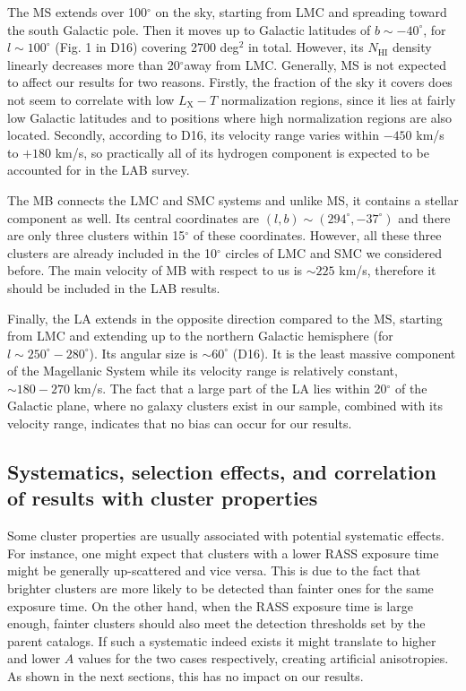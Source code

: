 \documentclass{aa}   %
\begin{document}
The MS extends over 100$^{\circ}$ on the sky, starting from LMC and spreading toward the south Galactic pole. Then it moves up to Galactic latitudes of $b\sim -40^{\circ}$, for $l\sim 100^{\circ}$ (Fig. 1 in D16) covering 2700 deg$^2$ in total. However, its $N_{\text{HI}}$ density linearly decreases more than 20$^{\circ}$away from LMC. Generally, MS is not expected to affect our results for two reasons. Firstly, the fraction of the sky it covers does not seem to correlate with low $L_{\text{X}}-T$ normalization regions, since it lies at fairly low Galactic latitudes and to positions where high normalization regions are also located. Secondly, according to D16, its velocity range varies within $-450$ km/s to $+180$ km/s, so practically all of its hydrogen component is expected to be accounted for in the LAB survey.

The MB connects the LMC and SMC systems and unlike MS, it contains a stellar component as well. Its central coordinates are $(l,b)\sim (294^{\circ}, -37^{\circ})$ and there are only three clusters within 15$^{\circ}$ of these coordinates. However, all these three clusters are already included in the 10$^{\circ}$ circles of LMC and SMC we considered before. The main velocity of MB with respect to us is $\sim 225$ km/s, therefore it should be included in the LAB results.

Finally, the LA extends in the opposite direction compared to the MS, starting from LMC and extending up to the northern Galactic hemisphere (for $l\sim 250^{\circ}-280^{\circ}$). Its angular size is $\sim 60^{\circ}$ (D16). It is the least massive component of the Magellanic System while its velocity range is relatively constant, $\sim 180-270$ km/s. The fact that a large part of the LA lies within 20$^{\circ}$ of the Galactic plane, where no galaxy clusters exist in our sample, combined with its velocity range, indicates that no bias can occur for our results.


\subsection{Systematics, selection effects, and correlation of results with cluster properties}\label{systemat_corr}

Some cluster properties are usually associated with potential systematic effects. For instance, one might expect that clusters with a lower RASS exposure time might be generally up-scattered and vice versa. This is due to the fact that brighter clusters are more likely to be detected than fainter ones for the same exposure time. On the other hand, when the RASS exposure time is large enough, fainter clusters should also meet the detection thresholds set by the parent catalogs. If such a systematic indeed exists it might translate to higher and lower $A$ values for the two cases respectively, creating artificial anisotropies. As shown in the next sections, this has no impact on our results.
\end{document}
